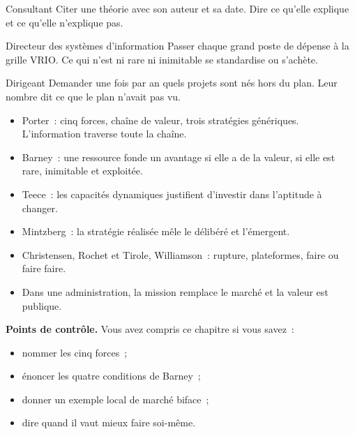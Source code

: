 \begin{boxmetier}{Consultant}
Citer une théorie avec son auteur et sa date. Dire ce qu'elle explique et ce qu'elle n'explique pas.
\end{boxmetier}

\begin{boxmetier}{Directeur des systèmes d'information}
Passer chaque grand poste de dépense à la grille VRIO. Ce qui n'est ni rare ni inimitable se standardise ou s'achète.
\end{boxmetier}

\begin{boxmetier}{Dirigeant}
Demander une fois par an quels projets sont nés hors du plan. Leur nombre dit ce que le plan n'avait pas vu.
\end{boxmetier}

\begin{boxresume}
\begin{itemize}
    \item Porter~: cinq forces, chaîne de valeur, trois stratégies génériques. L'information traverse toute la chaîne.
    \item Barney~: une ressource fonde un avantage si elle a de la valeur, si elle est rare, inimitable et exploitée.
    \item Teece~: les capacités dynamiques justifient d'investir dans l'aptitude à changer.
    \item Mintzberg~: la stratégie réalisée mêle le délibéré et l'émergent.
    \item Christensen, Rochet et Tirole, Williamson~: rupture, plateformes, faire ou faire faire.
    \item Dans une administration, la mission remplace le marché et la valeur est publique.
\end{itemize}
\end{boxresume}

\begin{boxinfo}
\textbf{Points de contrôle.} Vous avez compris ce chapitre si vous savez~:
\begin{itemize}
    \item nommer les cinq forces~;
    \item énoncer les quatre conditions de Barney~;
    \item donner un exemple local de marché biface~;
    \item dire quand il vaut mieux faire soi-même.
\end{itemize}
\end{boxinfo}

